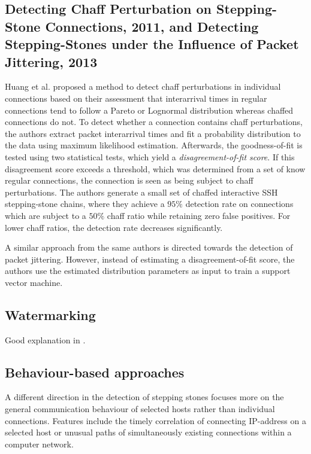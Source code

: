 \documentclass[conference]{IEEEtran}\usepackage[]{graphicx}\usepackage[]{color}
\begin{document}
\subsection{Detecting Chaff Perturbation on Stepping-Stone Connections, 2011, and Detecting Stepping-Stones under the  Influence of Packet Jittering, 2013}
Huang et al. \cite{huang2011detecting} proposed a method to detect chaff perturbations in individual connections based on their assessment that interarrival times in regular connections tend to follow a Pareto or Lognormal distribution whereas chaffed connections do not. To detect whether a connection contains chaff perturbations, the authors extract packet interarrival times and fit a probability distribution to the data using maximum likelihood estimation. Afterwards, the goodness-of-fit is tested using two statistical tests, which yield a \textit{disagreement-of-fit score}. If this disagreement score exceeds a threshold, which was determined from a set of know regular connections, the connection is seen as being subject to chaff perturbations. The authors generate a small set of chaffed interactive SSH stepping-stone chains, where they achieve a $95\%$ detection rate on connections which are subject to a $50\%$ chaff ratio while retaining zero false positives. For lower chaff ratios, the detection rate decreases significantly. 

A similar approach from the same authors \cite{ding2013detecting} is directed towards the detection of packet jittering. However, instead of estimating a disagreement-of-fit score, the authors use the estimated distribution parameters as input to train a support vector machine. 

\subsection{Watermarking}

Good explanation in \cite{padhye2010evading}.


\subsection{Behaviour-based approaches}

A different direction in the detection of stepping stones focuses more on the general communication behaviour of selected hosts rather than individual connections. Features include the timely correlation of connecting IP-address on a selected host or unusual paths of simultaneously existing connections within a computer network.
\end{document}
